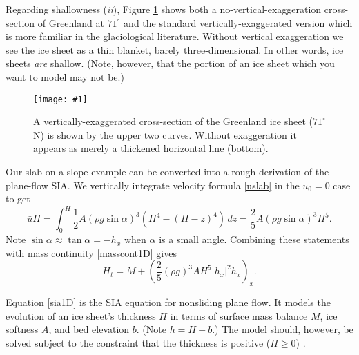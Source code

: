 \documentclass[letterpaper,final,12pt,reqno]{amsart}
\newcommand{\onefigsize}[3]{
\begin{figure}[ht]
\centering
\texttt{[image: \#1]}
\caption{#2}
\label{fig:#1}
\end{figure}}
\begin{document}
Regarding shallowness (\emph{ii}), Figure \ref{fig:green-transect} shows both a no-vertical-exaggeration cross-section of Greenland at $71^\circ$ and the standard vertically-exaggerated version which is more familiar in the glaciological literature.  Without vertical exaggeration we see the ice sheet as a thin blanket, barely three-dimensional.  In other words, ice sheets \emph{are} shallow.  (Note, however, that the portion of an ice sheet which you want to model may not be.)

\onefigsize{green-transect}{A vertically-exaggerated cross-section of the Greenland ice sheet ($71^\circ$ N) is shown by the upper two curves.  Without exaggeration it appears as merely a thickened horizontal line (bottom).}{3.5in}

Our slab-on-a-slope example can be converted into a rough derivation of the plane-flow SIA.  We vertically integrate velocity formula \eqref{uslab} in the $u_0=0$ case to get
\begin{equation}
\bar u H = \int_0^H \frac{1}{2} A (\rho g \sin\alpha)^3  \left(H^4 - (H-z)^4\right)\,dz = \frac{2}{5} A (\rho g \sin\alpha)^3 H^5. \label{siaubar}
\end{equation}
Note $\sin \alpha \approx \tan\alpha = - h_x$ when $\alpha$ is a small angle.  Combining these statements with mass continuity \eqref{masscont1D} gives
\begin{equation}
  H_t = M + \left(\frac{2}{5} (\rho g)^3 A H^5 |h_x|^2 h_x\right)_x. \label{sia1D}
\end{equation}

Equation \eqref{sia1D} is the SIA equation for nonsliding plane flow.  It models the evolution of an ice sheet's thickness $H$ in terms of surface mass balance $M$, ice softness $A$, and bed elevation $b$.  (Note $h=H+b$.)  The model should, however, be solved subject to the constraint that the thickness is positive ($H\ge 0$) \cite{Bueler2016,JouvetBueler2012}.
\end{document}
